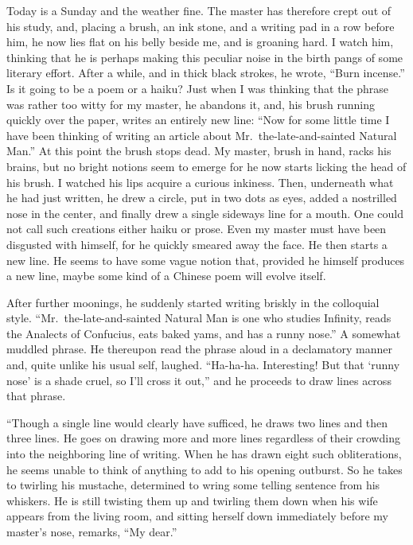 \documentclass{book}
\begin{document}
Today is a Sunday and the weather fine. The master has therefore crept
out of his study, and, placing a brush, an ink stone, and a writing pad
in a row before him, he now lies flat on his belly beside me, and is
groaning hard. I watch him, thinking that he is perhaps making this
peculiar noise in the birth pangs of some literary effort. After a
while, and in thick black strokes, he wrote, ``Burn incense.'' Is it
going to be a poem or a haiku? Just when I was thinking that the phrase
was rather too witty for my master, he abandons it, and, his brush
running quickly over the paper, writes an entirely new line: ``Now for
some little time I have been thinking of writing an article about
Mr.~the-late-and-sainted Natural Man.'' At this point the brush stops
dead. My master, brush in hand, racks his brains, but no bright notions
seem to emerge for he now starts licking the head of his brush. I
watched his lips acquire a curious inkiness. Then, underneath what he
had just written, he drew a circle, put in two dots as eyes, added a
nostrilled nose in the center, and finally drew a single sideways line
for a mouth. One could not call such creations either haiku or prose.
Even my master must have been disgusted with himself, for he quickly
smeared away the face. He then starts a new line. He seems to have some
vague notion that, provided he himself produces a new line, maybe some
kind of a Chinese poem will evolve itself.

After further moonings, he suddenly started writing briskly in the
colloquial style. ``Mr.~the-late-and-sainted Natural Man is one who
studies Infinity, reads the Analects of Confucius, eats baked yams, and
has a runny nose.'' A somewhat muddled phrase. He thereupon read the
phrase aloud in a declamatory manner and, quite unlike his usual self,
laughed. ``Ha-ha-ha. Interesting! But that `runny nose' is a shade
cruel, so I'll cross it out,'' and he proceeds to draw lines across that
phrase.

``Though a single line would clearly have sufficed, he draws two lines
and then three lines. He goes on drawing more and more lines regardless
of their crowding into the neighboring line of writing. When he has
drawn eight such obliterations, he seems unable to think of anything to
add to his opening outburst. So he takes to twirling his mustache,
determined to wring some telling sentence from his whiskers. He is still
twisting them up and twirling them down when his wife appears from the
living room, and sitting herself down immediately before my master's
nose, remarks, ``My dear.''
\end{document}
